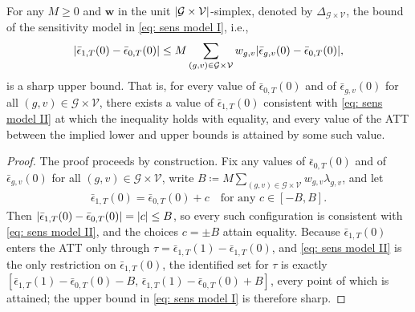 \documentclass[twoside,11pt]{article}
\begin{document}
\begin{proposition} \label{prop: tight sens bound}
For any $M \geq 0$ and $\bm{w}$ in the unit $\lvert\mathcal{G} \times \mathcal{V}\rvert$-simplex, denoted by $\Delta_{\mathcal{G} \times \mathcal{V}}$, the bound of the sensitivity model in \eqref{eq: sens model I}, i.e.,
\begin{align} \label{eq: sens model II}
\lvert\bar{\epsilon}_{1,T}(0) - \bar{\epsilon}_{0,T}(0)\rvert \leq M \sum \limits_{(g,v) \in \mathcal{G} \times \mathcal{V}} w_{g,v} \lvert\bar{\epsilon}_{g,v}(0) - \bar{\epsilon}_{0,T}(0)\rvert,
\end{align}
is a sharp upper bound. That is, for every value of $\bar{\epsilon}_{0,T}(0)$ and of $\bar{\epsilon}_{g,v}(0)$ for all $(g,v) \in \mathcal{G} \times \mathcal{V}$, there exists a value of $\bar{\epsilon}_{1,T}(0)$ consistent with \eqref{eq: sens model II} at which the inequality holds with equality, and every value of the \textrm{ATT} between the implied lower and upper bounds is attained by some such value.
\end{proposition}
\begin{proof}
The proof proceeds by construction. Fix any values of $\bar{\epsilon}_{0,T}(0)$ and of $\bar{\epsilon}_{g,v}(0)$ for all $(g,v) \in \mathcal{G} \times \mathcal{V}$, write $B \coloneqq M \sum_{(g,v) \in \mathcal{G} \times \mathcal{V}} w_{g,v} \lambda_{g,v}$, and let
\begin{align*}
\bar{\epsilon}_{1,T}(0) = \bar{\epsilon}_{0,T}(0) + c \quad \text{for any } c \in [-B, B].
\end{align*}
Then $\lvert\bar{\epsilon}_{1,T}(0) - \bar{\epsilon}_{0,T}(0)\rvert = \lvert c\rvert \leq B$, so every such configuration is consistent with \eqref{eq: sens model II}, and the choices $c = \pm B$ attain equality. Because $\bar{\epsilon}_{1,T}(0)$ enters the \textrm{ATT} only through $\tau = \bar{\epsilon}_{1,T}(1) - \bar{\epsilon}_{1,T}(0)$, and \eqref{eq: sens model II} is the only restriction on $\bar{\epsilon}_{1,T}(0)$, the identified set for $\tau$ is exactly $[\bar{\epsilon}_{1,T}(1) - \bar{\epsilon}_{0,T}(0) - B, \, \bar{\epsilon}_{1,T}(1) - \bar{\epsilon}_{0,T}(0) + B]$, every point of which is attained; the upper bound in \eqref{eq: sens model I} is therefore sharp.
\end{proof}


\vskip 0.2in

\end{document}
